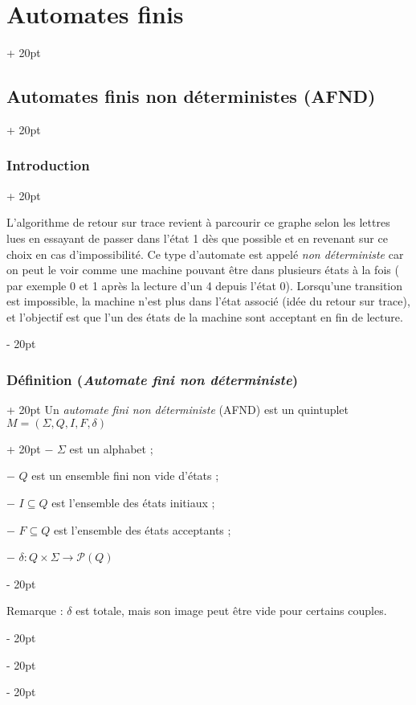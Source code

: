 \documentclass[a4paper, 12pt, twoside]{article}
\newcommand{\ind}[1][20pt]{\advance\leftskip + #1}
\newcommand{\deind}[1][20pt]{\advance\leftskip - #1}
\newenvironment{indt}[2][20pt]{#2 \par \ind[#1]}{\par \deind} %
\begin{document}
\begin{indt}{\section{Automates finis}}
\begin{indt}{\subsection{Automates finis non déterministes (AFND)}}
\begin{indt}{\subsubsection{Introduction}}
\begin{center}
                \end{center}

                L'algorithme de retour sur trace revient à parcourir ce graphe selon les lettres lues en essayant de passer dans l'état 1 dès que possible et en revenant sur ce choix en cas d'impossibilité.
                Ce type d'automate est appelé \emph{non déterministe} car on peut le voir comme une machine pouvant être dans plusieurs états à la fois ( par exemple 0 et 1 après la lecture d'un 4 depuis l'état 0).
                Lorsqu'une transition est impossible, la machine n'est plus dans l'état associé (idée du retour sur trace), et l'objectif est que l'un des états de la machine sont acceptant en fin de lecture.
            \end{indt}

            \vspace{12pt}
            
            \begin{indt}{\subsubsection{Définition (\textit{Automate fini non déterministe})}}
                \begin{indt}{Un \emph{automate fini non déterministe} (AFND) est un quintuplet $M = (\Sigma, Q, I, F, \delta)$}
                    $-$ $\Sigma$ est un alphabet ;

                    $-$ $Q$ est un ensemble fini non vide d'états ;

                    $-$ $I \subseteq Q$ est l'ensemble des états initiaux ;

                    $-$ $F \subseteq Q$ est l'ensemble des états acceptants ;

                    $-$ $\delta : Q \times \Sigma \longrightarrow \mathcal P(Q)$
                \end{indt}

                \vspace{12pt}
                
                Remarque : $\delta$ est totale, mais son image peut être vide pour certains couples.

                \vspace{12pt}
                

\end{indt}
\end{indt}
\end{indt}
\end{document}
